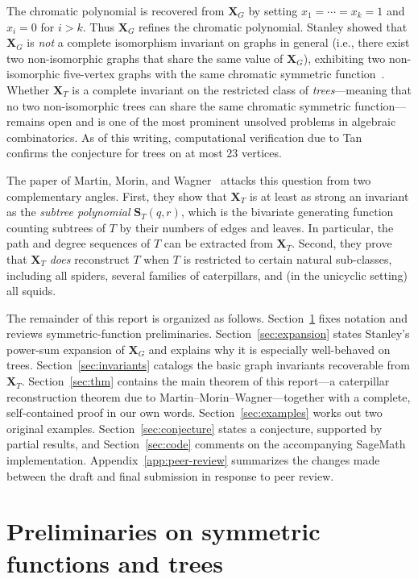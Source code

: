 \documentclass[11pt]{article}
\theoremstyle{definition}
\newcommand{\X}{\mathbf{X}}
\newcommand{\St}{\mathbf{S}}
\begin{document}
The chromatic polynomial is recovered from $\X_G$ by setting
$x_1=\cdots=x_k=1$ and $x_i=0$ for $i>k$.  Thus $\X_G$ refines the
chromatic polynomial.  Stanley showed that $\X_G$ is \emph{not} a
complete isomorphism invariant on graphs in general (i.e., there exist
two non-isomorphic graphs that share the same value of $\X_G$),
exhibiting two non-isomorphic five-vertex graphs with the same
chromatic symmetric function~\cite{Stanley}.  Whether $\X_T$ is a
complete invariant on the restricted class of \emph{trees}---meaning
that no two non-isomorphic trees can share the same chromatic symmetric
function---remains open and is one of the most prominent unsolved
problems in algebraic combinatorics.  As of this writing, computational
verification due to Tan~\cite{Tan} confirms the conjecture for trees on
at most $23$ vertices.

The paper of Martin, Morin, and Wagner~\cite{MMW} attacks this question
from two complementary angles.  First, they show that $\X_T$ is at least
as strong an invariant as the \emph{subtree polynomial} $\St_T(q,r)$,
which is the bivariate generating function counting subtrees of $T$ by
their numbers of edges and leaves.  In particular, the path and degree
sequences of $T$ can be extracted from $\X_T$.  Second, they prove that
$\X_T$ \emph{does} reconstruct $T$ when $T$ is restricted to certain
natural sub-classes, including all spiders, several families of
caterpillars, and (in the unicyclic setting) all squids.

The remainder of this report is organized as follows.
Section~\ref{sec:prelim} fixes notation and reviews symmetric-function
preliminaries.  Section~\ref{sec:expansion} states Stanley's power-sum
expansion of $\X_G$ and explains why it is especially well-behaved on
trees.  Section~\ref{sec:invariants} catalogs the basic graph invariants
recoverable from $\X_T$.  Section~\ref{sec:thm} contains the main
theorem of this report---a caterpillar reconstruction theorem due to
Martin--Morin--Wagner---together with a complete, self-contained proof
in our own words.  Section~\ref{sec:examples} works out two original
examples.  Section~\ref{sec:conjecture} states a conjecture, supported
by partial results, and Section~\ref{sec:code} comments on the
accompanying SageMath implementation.  Appendix~\ref{app:peer-review}
summarizes the changes made between the draft and final submission in
response to peer review.

\section{Preliminaries on symmetric functions and trees}\label{sec:prelim}
\end{document}
